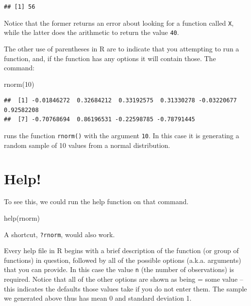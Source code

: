 \documentclass[
]{book}
\newenvironment{Shaded}{\begin{snugshade}}{\end{snugshade}}
\newcommand{\DecValTok}[1]{\textcolor[rgb]{0.00,0.00,0.81}{#1}}
\newcommand{\FunctionTok}[1]{\textcolor[rgb]{0.00,0.00,0.00}{#1}}
\newcommand{\NormalTok}[1]{#1}
\begin{document}
\begin{verbatim}
## [1] 56
\end{verbatim}

Notice that the former returns an error about looking for a function called \texttt{X}, while the latter does the arithmetic to return the value \texttt{40}.

The other use of parentheses in R are to indicate that you attempting to run a function, and, if the function has any options it will contain those. The command:

\begin{Shaded}
\begin{Highlighting}[]
\FunctionTok{rnorm}\NormalTok{(}\DecValTok{10}\NormalTok{)}
\end{Highlighting}
\end{Shaded}

\begin{verbatim}
##  [1] -0.01846272  0.32684212  0.33192575  0.31330278 -0.03220677  0.92582208
##  [7] -0.70768694  0.86196531 -0.22598785 -0.78791445
\end{verbatim}

runs the function \texttt{rnorm()} with the argument \texttt{10}. In this case it is generating a random sample of 10 values from a normal distribution.

\hypertarget{help}{%
\section{Help!}\label{help}}

To see this, we could run the help function on that command.

\begin{Shaded}
\begin{Highlighting}[]
\FunctionTok{help}\NormalTok{(rnorm)}
\end{Highlighting}
\end{Shaded}

A shortcut, \texttt{?rnorm}, would also work.

Every help file in R begins with a brief description of the function (or group of functions) in question, followed by all of the possible options (a.k.a. arguments) that you can provide. In this case the value \texttt{n} (the number of observations) is required. Notice that all of the other options are shown as being = some value -- this indicates the defaults those values take if you do not enter them. The sample we generated above thus has mean 0 and standard deviation 1.
\end{document}
